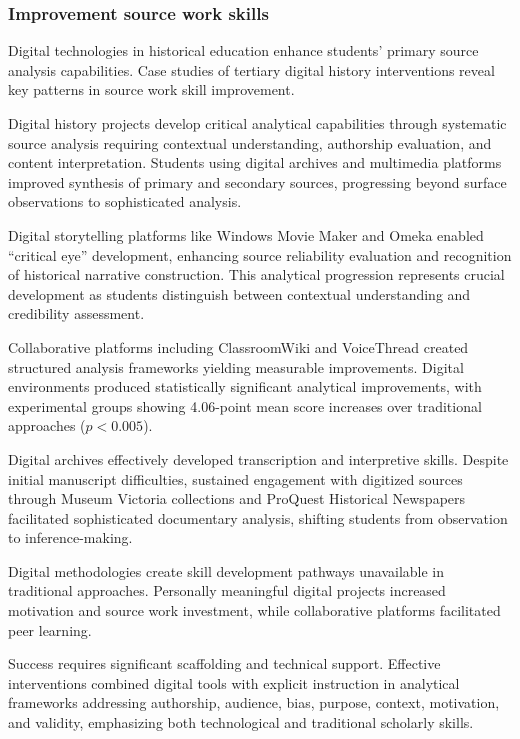 \documentclass[
hf,
]{ceurart}
\begin{document}
\subsubsection{Improvement source work skills}

Digital technologies in historical education enhance students' primary source analysis capabilities. Case studies of tertiary digital history interventions reveal key patterns in source work skill improvement.


Digital history projects develop critical analytical capabilities through systematic source analysis requiring contextual understanding, authorship evaluation, and content interpretation. Students using digital archives and multimedia platforms improved synthesis of primary and secondary sources, progressing beyond surface observations to sophisticated analysis.

Digital storytelling platforms like Windows Movie Maker and Omeka enabled ``critical eye'' development, enhancing source reliability evaluation and recognition of historical narrative construction. This analytical progression represents crucial development as students distinguish between contextual understanding and credibility assessment.


Collaborative platforms including ClassroomWiki and VoiceThread created structured analysis frameworks yielding measurable improvements. Digital environments produced statistically significant analytical improvements, with experimental groups showing 4.06-point mean score increases over traditional approaches ($p < 0.005$).

Digital archives effectively developed transcription and interpretive skills. Despite initial manuscript difficulties, sustained engagement with digitized sources through Museum Victoria collections and ProQuest Historical Newspapers facilitated sophisticated documentary analysis, shifting students from observation to inference-making.

Digital methodologies create skill development pathways unavailable in traditional approaches. Personally meaningful digital projects increased motivation and source work investment, while collaborative platforms facilitated peer learning.

Success requires significant scaffolding and technical support. Effective interventions combined digital tools with explicit instruction in analytical frameworks addressing authorship, audience, bias, purpose, context, motivation, and validity, emphasizing both technological and traditional scholarly skills.
\end{document}
